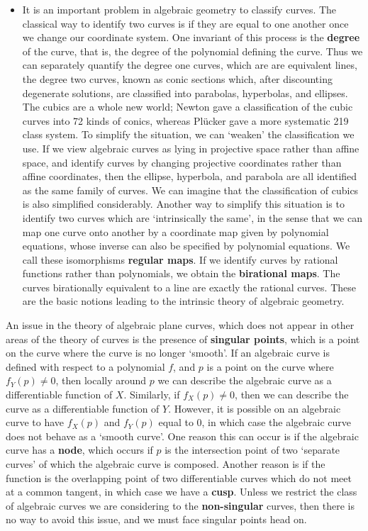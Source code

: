 \begin{itemize}
    \item It is an important problem in algebraic geometry to classify curves. The classical way to identify two curves is if they are equal to one another once we change our coordinate system. One invariant of this process is the {\bf degree} of the curve, that is, the degree of the polynomial defining the curve. Thus we can separately quantify the degree one curves, which are are equivalent lines, the degree two curves, known as conic sections which, after discounting degenerate solutions, are classified into parabolas, hyperbolas, and ellipses. The cubics are a whole new world; Newton gave a classification of the cubic curves into 72 kinds of conics, whereas Pl\"{u}cker gave a more systematic 219 class system. To simplify the situation, we can `weaken' the classification we use. If we view algebraic curves as lying in projective space rather than affine space, and identify curves by changing projective coordinates rather than affine coordinates, then the ellipse, hyperbola, and parabola are all identified as the same family of curves. We can imagine that the classification of cubics is also simplified considerably. Another way to simplify this situation is to identify two curves which are `intrinsically the same', in the sense that we can map one curve onto another by a coordinate map given by polynomial equations, whose inverse can also be specified by polynomial equations. We call these isomorphisms {\bf regular maps}. If we identify curves by rational functions rather than polynomials, we obtain the {\bf birational maps}. The curves birationally equivalent to a line are exactly the rational curves. These are the basic notions leading to the intrinsic theory of algebraic geometry.
\end{itemize}

An issue in the theory of algebraic plane curves, which does not appear in other areas of the theory of curves is the presence of {\bf singular points}, which is a point on the curve where the curve is no longer `smooth'. If an algebraic curve is defined with respect to a polynomial $f$, and $p$ is a point on the curve where $f_Y(p) \neq 0$, then locally around $p$ we can describe the algebraic curve as a differentiable function of $X$. Similarly, if $f_X(p) \neq 0$, then we can describe the curve as a differentiable function of $Y$. However, it is possible on an algebraic curve to have $f_X(p)$ and $f_Y(p)$ equal to 0, in which case the algebraic curve does not behave as a `smooth curve'. One reason this can occur is if the algebraic curve has a {\bf node}, which occurs if $p$ is the intersection point of two `separate curves' of which the algebraic curve is composed. Another reason is if the function is the overlapping point of two differentiable curves which do not meet at a common tangent, in which case we have a {\bf cusp}. Unless we restrict the class of algebraic curves we are considering to the {\bf non-singular} curves, then there is no way to avoid this issue, and we must face singular points head on.

